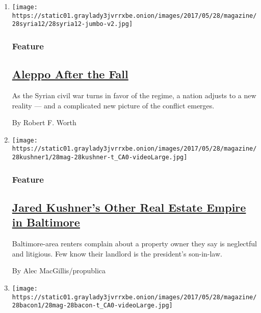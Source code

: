 \begin{enumerate}
\def\labelenumi{\arabic{enumi}.}
\item
  \texttt{[image: https://static01.graylady3jvrrxbe.onion/images/2017/05/28/magazine/28syria12/28syria12-jumbo-v2.jpg]}

  \hypertarget{feature}{%
  \subsubsection{Feature}\label{feature}}

  \hypertarget{aleppo-after-the-fall}{%
  \subsection{\texorpdfstring{\href{/2017/05/24/magazine/aleppo-after-the-fall.html}{Aleppo
  After the Fall}}{Aleppo After the Fall}}\label{aleppo-after-the-fall}}

  As the Syrian civil war turns in favor of the regime, a nation adjusts
  to a new reality --- and a complicated new picture of the conflict
  emerges.

  By Robert F. Worth
\item
  \texttt{[image: https://static01.graylady3jvrrxbe.onion/images/2017/05/28/magazine/28kushner1/28mag-28kushner-t\_CA0-videoLarge.jpg]}

  \hypertarget{feature-1}{%
  \subsubsection{Feature}\label{feature-1}}

  \hypertarget{jared-kushners-other-real-estate-empire-in-baltimore}{%
  \subsection{\texorpdfstring{\href{/2017/05/23/magazine/jared-kushners-other-real-estate-empire.html}{Jared
  Kushner's Other Real Estate Empire in
  Baltimore}}{Jared Kushner's Other Real Estate Empire in Baltimore}}\label{jared-kushners-other-real-estate-empire-in-baltimore}}

  Baltimore-area renters complain about a property owner they say is
  neglectful and litigious. Few know their landlord is the president's
  son-in-law.

  By Alec MacGillis/propublica
\item
  \texttt{[image: https://static01.graylady3jvrrxbe.onion/images/2017/05/28/magazine/28bacon1/28mag-28bacon-t\_CA0-videoLarge.jpg]}


\end{enumerate}
